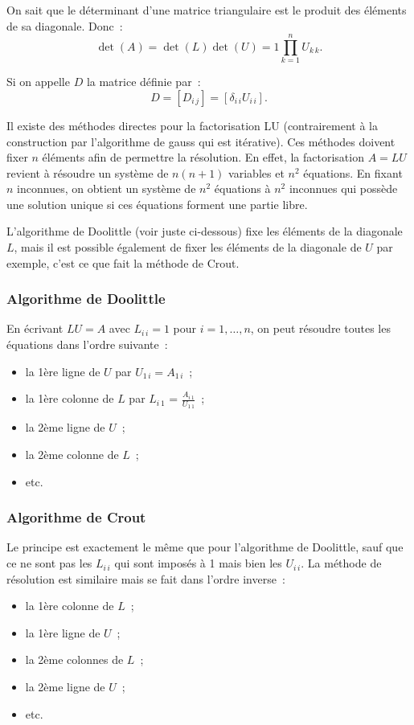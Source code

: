 \documentclass{article}
\theoremstyle{definition}
\theoremstyle{remark}
\begin{document}
		On sait que le déterminant d'une matrice triangulaire est le produit des éléments de sa diagonale. Donc~:
		\[\det(A)=\det(L)\det(U) = 1\prod_{k=1}^nU_{k\,k}.\]

		Si on appelle $D$ la matrice définie par~:
		\[D = [D_{i\,j}] = \left[\delta_{i\,i}U_{i\,i}\right].\]

		Il existe des méthodes directes pour la factorisation LU (contrairement à la construction par l'algorithme de gauss qui est itérative). Ces méthodes
		doivent fixer $n$ éléments afin de permettre la résolution. En effet, la factorisation $A = LU$ revient à résoudre un système de $n(n+1)$ variables et
		$n^2$ équations. En fixant $n$ inconnues, on obtient un système de $n^2$ équations à $n^2$ inconnues qui possède une solution unique si ces équations
		forment une partie libre.

		L'algorithme de Doolittle (voir juste ci-dessous) fixe les éléments de la diagonale $L$, mais il est possible également de fixer les éléments de la
		diagonale de $U$ par exemple, c'est ce que fait la méthode de Crout.

		\subsubsection{Algorithme de Doolittle}
		En écrivant $LU = A$ avec $L_{i\,i} = 1$ pour $i = 1, \dotsc, n$, on peut résoudre toutes les équations dans l'ordre suivante~:
		\begin{itemize}
			\item la 1ère ligne de $U$ par $U_{1\,i} = A_{1\,i}$~;
			\item la 1ère colonne de $L$ par $L_{i\,1}$ = $\frac {A_{i\,1}}{U_{1\,1}}$~;
			\item la 2ème ligne de $U$~;
			\item la 2ème colonne de $L$~;
			\item etc.
		\end{itemize}

		\subsubsection{Algorithme de Crout}
		Le principe est exactement le même que pour l'algorithme de Doolittle, sauf que ce ne sont pas les $L_{i\,i}$ qui sont imposés à 1 mais bien les
		$U_{i\,i}$. La méthode de résolution est similaire mais se fait dans l'ordre inverse~:
		\begin{itemize}
			\item la 1ère colonne de $L$~;
			\item la 1ère ligne de $U$~;
			\item la 2ème colonnes de $L$~;
			\item la 2ème ligne de $U$~;
			\item etc.
		\end{itemize}
\end{document}
